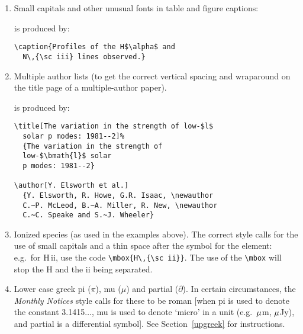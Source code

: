 \documentclass[useAMS,usenatbib]{mn2e}
\begin{document}
\begin{enumerate}

\item Small capitals and other unusual fonts in table and figure captions:
\par\smallskip
{}
%
is produced by:
%
\begin{verbatim}
\caption{Profiles of the H$\alpha$ and
  N\,{\sc iii} lines observed.}
\end{verbatim}

\item Multiple author lists (to get the correct vertical spacing
and wraparound on the title page of a multiple-author paper).
\par\smallskip

%
is produced by:
%
\begin{verbatim}
\title[The variation in the strength of low-$l$
  solar p modes: 1981--2]%
  {The variation in the strength of
  low-$\bmath{l}$ solar
  p modes: 1981--2}

\author[Y. Elsworth et al.]
  {Y. Elsworth, R. Howe, G.R. Isaac, \newauthor
  C.~P. McLeod, B.~A. Miller, R. New, \newauthor
  C.~C. Speake and S.~J. Wheeler}
\end{verbatim}

\item Ionized species (as used in the examples above). The correct
style calls for the use of small capitals and a thin space after
the symbol for the element: e.g.\ for \hbox{H\,{\sc ii}}, use the
code \verb"\mbox{H\,{\sc ii}}". The use of the \verb"\mbox" will
stop the H and the {\sc ii} being separated.

\item Lower case greek pi ($\pi$), mu ($\mu$) and partial ($\partial$).
In certain circumstances, the \textit{Monthly Notices} style calls
for these to be roman [when pi is used to denote the constant
3.1415$\ldots$, mu is used to denote `micro' in a unit (e.g.\
$\mu$m, $\mu$Jy), and partial is a differential symbol]. See
Section~\ref{upgreek} for instructions.


\end{enumerate}
\end{document}
